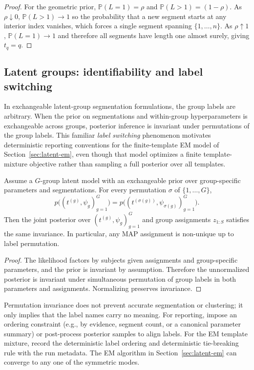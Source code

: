 \begin{proof}
For the geometric prior, $\mathbb{P}(L=1)=\rho$ and $\mathbb{P}(L>1)=(1-\rho)$.
As $\rho\downarrow 0$, $\mathbb{P}(L>1)\to 1$ so the probability that a new segment starts at any interior index vanishes,
which forces a single segment spanning $\{1,\dots,n\}$.
As $\rho\uparrow 1$, $\mathbb{P}(L=1)\to 1$ and therefore all segments have length one almost surely, giving $t_q=q$.
\end{proof}

\subsection{Latent groups: identifiability and label switching}
\label{app:label-switching}

In exchangeable latent-group segmentation formulations, the group labels are arbitrary.
When the prior on segmentations and within-group hyperparameters is exchangeable across groups,
posterior inference is invariant under permutations of the group labels. This familiar
\emph{label switching} phenomenon motivates deterministic reporting conventions for the
finite-template EM model of Section~\ref{sec:latent-em}, even though that model optimizes a
finite template-mixture objective rather than sampling a full posterior over all templates.

\begin{proposition}
\label{prop:perm-invariance}
Assume a $G$-group latent model with an exchangeable prior over group-specific parameters and segmentations.
For every permutation $\sigma$ of $\{1,\dots,G\}$,
\[
p\big((t^{(g)},\psi_g)_{g=1}^G\big)
=
p\big((t^{(\sigma(g))},\psi_{\sigma(g)})_{g=1}^G\big).
\]
Then the joint posterior over $(t^{(g)},\psi_g)_{g=1}^G$ and group assignments $z_{1:S}$ satisfies the same invariance.
In particular, any MAP assignment is non-unique up to label permutation.
\end{proposition}

\begin{proof}
The likelihood factors by subjects given assignments and group-specific parameters, and the prior is invariant by assumption.
Therefore the unnormalized posterior is invariant under simultaneous permutation of group labels in both parameters and assignments.
Normalizing preserves invariance.
\end{proof}

\begin{remark}
Permutation invariance does not prevent accurate segmentation or clustering; it only implies that the label names carry no meaning.
For reporting, impose an ordering constraint (e.g., by evidence, segment count, or a canonical parameter summary) or
post-process posterior samples to align labels. For the EM template mixture, record the deterministic
label ordering and deterministic tie-breaking rule with the run metadata.
The EM algorithm in Section~\ref{sec:latent-em} can converge to any one of the symmetric modes.
\end{remark}

